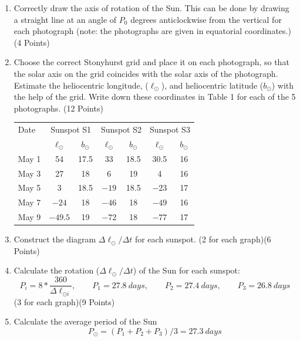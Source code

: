 
\begin{enumerate}
\item Correctly draw the axis of rotation of the Sun. This can be done by
  drawing a straight line at an angle of $P_0$ degrees anticlockwise from the
  vertical for each photograph (note: the photographs are given in equatorial
  coordinates.) \hfill(4 Points)
\item Choose the correct Stonyhurst grid and place it on each photograph, so
  that the solar axis on the grid coincides with the solar axis of the
  photograph. Estimate the heliocentric longitude, ($\ell_\odot$), and
  heliocentric latitude ($b_\odot$) with the help of the grid. Write down
  these coordinates in Table 1 for each of the 5
  photographs. \hfill(12 Points)

  \begin{center}
  \begin{tabular}{l cc cc cc}
  \toprule
  Date & \multicolumn{2}{c}{Sunspot S1}
    & \multicolumn{2}{c}{Sunspot S2} & \multicolumn{2}{c}{Sunspot S3}\\
  & $\ell_\odot$ & $b_\odot$ & $\ell_\odot$ & $b_\odot$
    & $\ell_\odot$ & $b_\odot$\\
  \midrule
  May 1 & 54    & 17.5 & 33  & 18.5 & 30.5 & 16\\
  May 3 & 27    & 18   & 6   & 19   & 4    & 16\\
  May 5 & 3     & 18.5 & $-19$ & 18.5 & $-23$ & 17\\
  May 7 & $-24$ & 18   & $-46$ & 18   & $-49$ & 16\\
  May 9 & $-49.5$ & 19 & $-72$ & 18   & $-77$ & 17\\
  \bottomrule
  \end{tabular}
  \end{center}
\item Construct the diagram $\Delta\ell_\odot/\Delta t$ for each sunspot.
  \hfill(2 for each graph)\quad(6 Points)

\item Calculate the rotation ($\Delta\ell_\odot/\Delta t$) of the Sun for each
  sunspot:
  \[
  P_i = 8 * \frac{360}{\Delta\ell_{\odot i}}, \qquad
  P_1 = 27.8~days, \qquad
  P_2 = 27.4~days, \qquad
  P_3 = 26.8~days
  \]
  \hfill(3 for each graph)\quad(9 Points)
\item Calculate the average period of the Sun
  \begin{equation*}
  P_\odot = (P_1 + P_2 + P_3)/3 = 27.3~days \tag*{(1.5 Point)}
  \end{equation*}
\end{enumerate}


